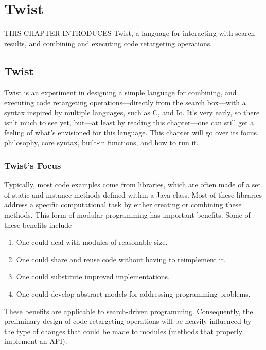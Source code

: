 \chapter{Twist}{}
\label{chap:twist}

\lettrine[lraise=0.1, nindent=0em, slope=-.5em]{T}{HIS CHAPTER INTRODUCES} Twist, a language for interacting with search results, and combining and executing code retargeting operations. 

\section{Twist}
\label{sec:twist}

Twist is an experiment in designing a simple language for combining, and executing code retargeting operations---directly from the search box---with a syntax inspired by multiple languages, such as C, and Io. It's very early, so there isn't much to see yet, but---at least by reading this chapter---one can still get a feeling of what's envisioned for this language. This chapter will go over its focus, philosophy, core syntax, built-in functions, and how to run it.

\subsection{Twist's Focus}
\label{sec:focus}

Typically, most code examples come from libraries, which are often made of a set of static and instance methods defined within a Java class. Most of these libraries address a specific computational task by either creating or combining these methods. This form of modular programming has important benefits\cite{Sedgewick:2011tx}. Some of these benefits include 

\begin{enumerate}
	\item One could deal with modules of reasonable size.
	\item One could share and reuse code without having to reimplement it.
	\item One could substitute improved implementations.
	\item One could develop abstract models for addressing programming problems.
\end{enumerate}

These benefits are applicable to search-driven programming. Consequently, the preliminary design of code retargeting operations will be heavily influenced by the type of changes that could be made to modules (methods that properly implement an API).

